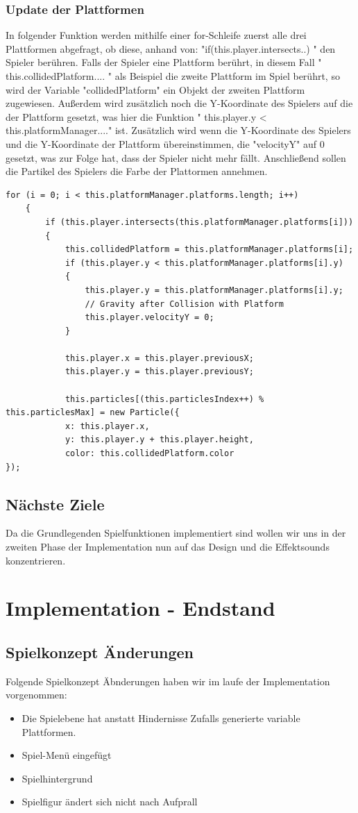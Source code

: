 \subsubsection{Update der Plattformen}
In folgender Funktion werden mithilfe einer for-Schleife zuerst alle drei Plattformen abgefragt, ob diese, anhand von: "if(this.player.intersects..) " den Spieler ber\"uhren. Falls der Spieler eine Plattform ber\"uhrt, in diesem Fall " this.collidedPlatform.... " als Beispiel die zweite Plattform im Spiel ber\"uhrt, so wird der Variable "collidedPlatform" ein Objekt der zweiten Plattform zugewiesen. Außerdem wird zus\"atzlich noch die Y-Koordinate des Spielers auf die der Plattform gesetzt, was hier die Funktion " this.player.y < this.platformManager...." ist. Zus\"atzlich wird wenn die Y-Koordinate des Spielers und die Y-Koordinate der Plattform \"ubereinstimmen, die "velocityY" auf 0 gesetzt, was zur Folge hat, dass der Spieler nicht mehr f\"allt. Anschließend sollen die Partikel des Spielers die Farbe der Plattormen annehmen.
\lstset{language=java}
\begin{lstlisting}[frame=single]
    for (i = 0; i < this.platformManager.platforms.length; i++) 
    {
		if (this.player.intersects(this.platformManager.platforms[i])) 
		{
			this.collidedPlatform = this.platformManager.platforms[i];
			if (this.player.y < this.platformManager.platforms[i].y) 
			{
				this.player.y = this.platformManager.platforms[i].y;
				// Gravity after Collision with Platform
				this.player.velocityY = 0;
			}

			this.player.x = this.player.previousX;
			this.player.y = this.player.previousY;
			
			this.particles[(this.particlesIndex++) % this.particlesMax] = new Particle({
			x: this.player.x,
			y: this.player.y + this.player.height,
			color: this.collidedPlatform.color
});
\end{lstlisting}
\subsection{Nächste Ziele}
Da die Grundlegenden Spielfunktionen implementiert sind wollen wir uns in der zweiten Phase der Implementation nun auf das Design und die Effektsounds konzentrieren.
\section{Implementation - Endstand}
\subsection{Spielkonzept Änderungen}
Folgende Spielkonzept Äbnderungen haben wir im laufe der Implementation vorgenommen:
\begin{itemize}
	\item Die Spielebene hat anstatt Hindernisse Zufalls generierte variable Plattformen.
	\item Spiel-Menü eingefügt
	\item Spielhintergrund
	\item Spielfigur ändert sich nicht nach Aufprall
\end{itemize}
